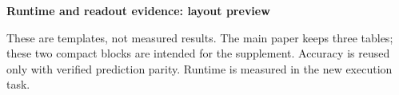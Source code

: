 \documentclass[10pt]{article}
\begin{document}
\begin{center}\Large\bfseries Runtime and readout evidence: layout preview\end{center}
\noindent These are templates, not measured results. The main paper keeps three tables;
these two compact blocks are intended for the supplement. Accuracy is reused only
with verified prediction parity. Runtime is measured in the new execution task.

\end{document}
